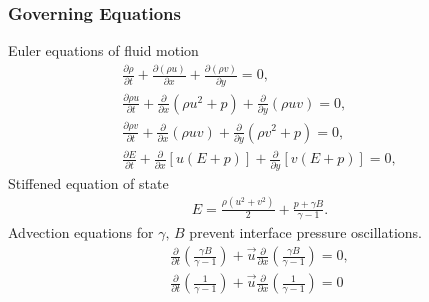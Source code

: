 \begin{frame} \frametitle{\vspace*{0.5cm}Governing Equations}
  \vfil\vspace*{0.5cm}
  {\small
    \hspace*{1cm}Euler equations of fluid motion
  }
  {\scriptsize
    \begin{align*}%
      \frac{\partial \rho}{\partial t} + \frac{\partial \left(\rho u\right)}{\partial x} + \frac{\partial \left(\rho v\right)}{\partial y} = 0,\\
      \frac{\partial \rho u}{\partial t} + \frac{\partial}{\partial x}\left( \rho u^2+p\right)  + \frac{\partial}{\partial y}\left( \rho uv\right) = 0,\\
      \frac{\partial \rho v}{\partial t} + \frac{\partial}{\partial x}\left( \rho uv\right)  + \frac{\partial}{\partial y}\left( \rho v^2+p\right) = 0,\\
      \frac{\partial E}{\partial t} + \frac{\partial}{\partial x}\left[u\left(E+p\right)\right] + \frac{\partial}{\partial y}\left[v\left(E+p\right)\right] = 0,
    \end{align*}%
  }
  \vfil
  {\small
    \hspace*{1cm}Stiffened equation of state
  }
  {\scriptsize
    \begin{align*} \label{eq:stiffened_eos}%
      E=\frac{\rho\left(u^2+v^2\right)}{2} + \frac{p+\gamma B}{\gamma-1}.
    \end{align*}
  }
  \vfil
  {\small
    \hspace*{1cm}Advection equations for $\gamma,\,B$ prevent interface pressure oscillations.
  }
  \scriptsize{
    \begin{align*}
      \frac{\partial}{\partial t}\left(\frac{\gamma B}{\gamma-1}\right)+\vec{u}\frac{\partial}{\partial x}\left(\frac{\gamma B}{\gamma-1}\right) = 0,\\%
      \frac{\partial}{\partial t}\left(\frac{1}{\gamma-1}\right)+\vec{u}\frac{\partial}{\partial x}\left(\frac{1}{\gamma-1}\right) = 0%
    \end{align*}
  }
\end{frame}
